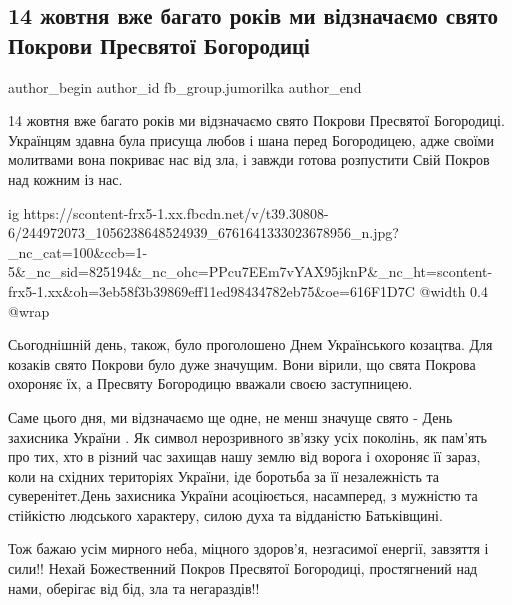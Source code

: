  
 
 
 
 
 
\subsection{14 жовтня вже багато років ми відзначаємо свято Покрови Пресвятої Богородиці}
\label{sec:14_10_2021.fb.fb_group.jumorilka.1.pokrova}
 
\ifcmt
 author_begin
   author_id fb_group.jumorilka
 author_end
\fi

14 жовтня вже багато років ми відзначаємо свято Покрови Пресвятої Богородиці.
Українцям здавна була присуща любов і шана  перед Богородицею, адже своїми
молитвами вона покриває нас від зла, і завжди готова розпустити Свій Покров над
кожним із нас.

\ifcmt
  ig https://scontent-frx5-1.xx.fbcdn.net/v/t39.30808-6/244972073_1056238648524939_6761641333023678956_n.jpg?_nc_cat=100&ccb=1-5&_nc_sid=825194&_nc_ohc=PPcu7EEm7vYAX95jknP&_nc_ht=scontent-frx5-1.xx&oh=3eb58f3b39869eff11ed98434782eb75&oe=616F1D7C
  @width 0.4
  @wrap 
\fi

Сьогоднішній день, також, було проголошено Днем Українського козацтва. Для
козаків свято Покрови було дуже значущим. Вони вірили, що  свята Покрова
охороняє їх, а Пресвяту Богородицю вважали своєю заступницею.

Саме цього дня, ми відзначаємо ще одне, не менш значуще свято - День
захисника України . Як символ нерозривного зв'язку усіх поколінь, як пам'ять
про тих, хто в різний час захищав нашу землю від ворога і охороняє її зараз,
коли на східних територіях України, іде боротьба за її незалежність та
суверенітет.День захисника України асоціюється, насамперед, з мужністю та
стійкістю людського характеру, силою духа та відданістю Батьківщині. 

Тож бажаю усім мирного неба, міцного здоров'я, незгасимої енергії, завзяття і
сили!! Нехай Божественний Покров Пресвятої Богородиці, простягнений над нами,
оберігає від бід, зла та негараздів!!
